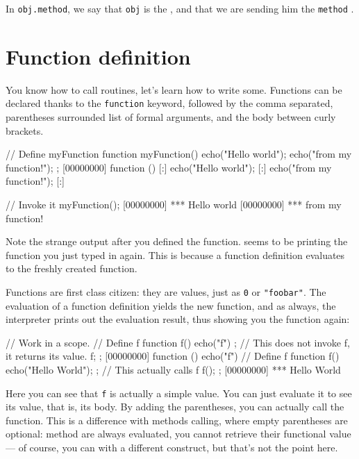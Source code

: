 In \lstinline|obj.method|, we say that \lstinline{obj} is the
, and that we are sending him the \lstinline{method}
.

\section{Function definition}

You know how to call routines, let's learn how to write
some. Functions can be declared thanks to the \lstinline{function}
keyword, followed by the comma separated, parentheses surrounded list
of formal arguments, and the body between curly brackets.

\begin{urbiscript}
// Define myFunction
function myFunction()
{
  echo("Hello world");
  echo("from my function!");
};
[00000000] function () {
[:]  echo("Hello world");
[:]  echo("from my function!");
[:]}

// Invoke it
myFunction();
[00000000] *** Hello world
[00000000] *** from my function!
\end{urbiscript}

Note the strange output after you defined the function. \us seems to
be printing the function you just typed in again. This is because
a function definition evaluates to the freshly created function.

Functions are first class citizen: they are values, just as
\lstinline{0} or \lstinline{"foobar"}.  The evaluation of a function
definition yields the new function, and as always, the interpreter
prints out the evaluation result, thus showing you the function
again:

\begin{urbiscript}
// Work in a scope.
{
  // Define f
  function f()
  {
    echo("f")
  };
  // This does not invoke f, it returns its value.
  f;
};
[00000000] function () { echo("f") }
{
  // Define f
  function f()
  {
    echo("Hello World");
  };
  // This actually calls f
  f();
};
[00000000] *** Hello World
\end{urbiscript}

Here you can see that \lstinline{f} is actually a simple value. You can just
evaluate it to see its value, that is, its body. By adding the
parentheses, you can actually call the function. This is a difference
with methods calling, where empty parentheses are optional: method are
always evaluated, you cannot retrieve their functional value --- of
course, you can with a different construct, but that's not the point
here.

